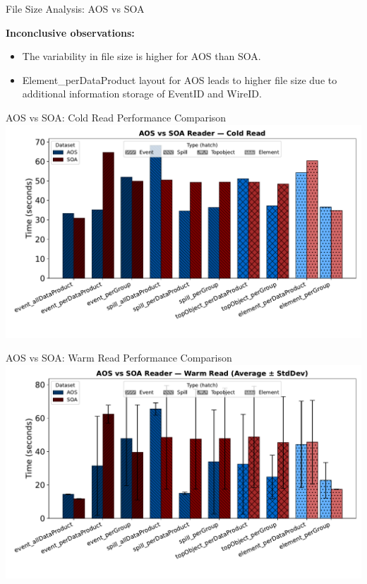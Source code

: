 \documentclass[aspectratio=169]{beamer}
\begin{document}
\begin{frame}{File Size Analysis: AOS vs SOA}
{\begin{minipage}[t]{0.38\textwidth}
    \end{minipage}
  }
  \textbf{Inconclusive observations:}
  \begin{itemize}
    \item The variability in file size is higher for AOS than SOA.
    \item Element\_perDataProduct layout for AOS leads to higher file size due to additional information storage of EventID and WireID. 
  \end{itemize}
\end{frame}

\begin{frame}{AOS vs SOA: Cold Read Performance Comparison}
\centering
\includegraphics[width=0.8\linewidth]{../experiments/Seaborn/AOS_SOA_Reader_Cold_grouped.pdf}
\end{frame}

\begin{frame}{AOS vs SOA: Warm Read Performance Comparison}
\centering
\includegraphics[width=0.8\linewidth]{../experiments/Seaborn/AOS_SOA_Reader_Warm_grouped.pdf}
\end{frame}
\end{document}
